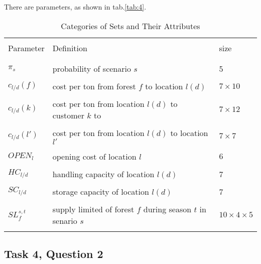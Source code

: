 \documentclass[fleqn,10pt]{wlscirep}
\begin{document}
There are parameters, as shown in tab.\ref{tab:4}.
\begin{table}[ht]
    \centering
    \begin{tabular}{l l l}
        \hline
        \\[-1em]
        Parameter & Definition & size \\
        \\[-1em]
        \hline
        \\[-1em]
        $\pi_s$ & probability of scenario $s$ & 5 \\
        \\[-1em]
        $c_{l/d}(f)$ & cost per ton from forest $f$ to location $l(d)$ & $7 \times 10$ \\
        \\[-1em]
        $c_{l/d}(k)$ & cost per ton from location $l(d)$ to customer $k$ to & $7 \times 12$ \\
        \\[-1em]
        $c_{l/d}(l')$ & cost per ton from location $l(d)$ to location $l'$ & $7 \times 7$ \\
        \\[-1em]
        $OPEN_l$ & opening cost of location $l$ & $6$ \\
        \\[-1em]
        $HC_{l/d}$ & handling capacity of location $l(d)$ & 7 \\
        \\[-1em]
        $SC_{l/d}$ & storage capacity of location $l(d)$ & 7 \\
        \\[-1em]
        $SL_{f}^{s, t}$ & supply limited of forest $f$ during season $t$ in senario $s$ & $10 \times 4 \times 5$ \\
        \\[-1em]
        \hline
    \end{tabular}
    \caption{Categories of Sets and Their Attributes}
    \label{tab:2}
\end{table}
\FloatBarrier

\subsection{Task 4, Question 2}
\end{document}
